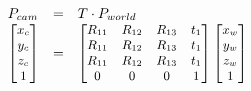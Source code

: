 \begin{equation}
  \begin{array}{lll}
    P_{cam} & = & T \cdot P_{world} \\
    \begin{small}
      \left[ 
        \begin{matrix} 
          x_c \\
          y_c \\
          z_c \\
          1
        \end{matrix} 
      \right] 
    \end{small}
    & = & 
      \begin{small}
      \left[ 
        \begin{matrix} 
          R_{11} & R_{12} & R_{13} & t_1 \\
          R_{11} & R_{12} & R_{13} & t_1  \\
          R_{11} & R_{12} & R_{13} & t_1  \\
          0      & 0      & 0      & 1
        \end{matrix} 
      \right] 
      \left[ 
        \begin{matrix} 
          x_w \\
          y_w \\
          z_w \\
          1
        \end{matrix} 
      \right] 
    \end{small}
  \end{array}
\label{eq:idp1}
\end{equation}
